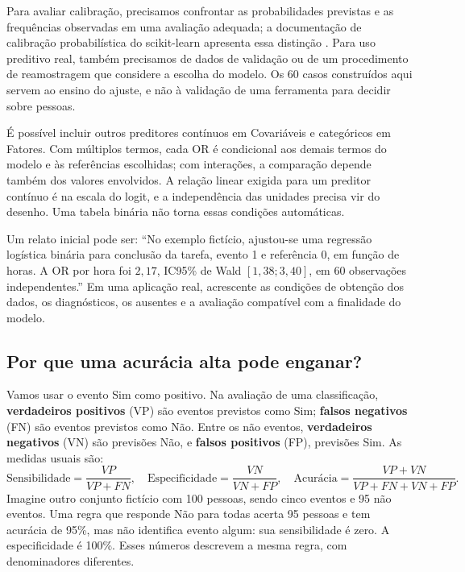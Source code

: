 Para avaliar calibração, precisamos confrontar as probabilidades previstas e as frequências observadas em uma avaliação adequada; a documentação de calibração probabilística do scikit-learn apresenta essa distinção \parencite{SKLearnCalibracao}. Para uso preditivo real, também precisamos de dados de validação ou de um procedimento de reamostragem que considere a escolha do modelo. Os 60 casos construídos aqui servem ao ensino do ajuste, e não à validação de uma ferramenta para decidir sobre pessoas.

É possível incluir outros preditores contínuos em Covariáveis e categóricos em Fatores. Com múltiplos termos, cada OR é condicional aos demais termos do modelo e às referências escolhidas; com interações, a comparação depende também dos valores envolvidos. A relação linear exigida para um preditor contínuo é na escala do logit, e a independência das unidades precisa vir do desenho. Uma tabela binária não torna essas condições automáticas.

Um relato inicial pode ser: ``No exemplo fictício, ajustou-se uma regressão logística binária para conclusão da tarefa, evento 1 e referência 0, em função de horas. A OR por hora foi $2{,}17$, IC95\% de Wald $[1{,}38;3{,}40]$, em 60 observações independentes.'' Em uma aplicação real, acrescente as condições de obtenção dos dados, os diagnósticos, os ausentes e a avaliação compatível com a finalidade do modelo.

\subsection{Por que uma acurácia alta pode enganar?}

Vamos usar o evento Sim como positivo. Na avaliação de uma classificação, \textbf{verdadeiros positivos} (VP) são eventos previstos como Sim; \textbf{falsos negativos} (FN) são eventos previstos como Não. Entre os não eventos, \textbf{verdadeiros negativos} (VN) são previsões Não, e \textbf{falsos positivos} (FP), previsões Sim. As medidas usuais são:
\[
\text{Sensibilidade}=\frac{VP}{VP+FN},\quad
\text{Especificidade}=\frac{VN}{VN+FP},\quad
\text{Acurácia}=\frac{VP+VN}{VP+FN+VN+FP}.
\]
Imagine outro conjunto fictício com 100 pessoas, sendo cinco eventos e 95 não eventos. Uma regra que responde Não para todas acerta 95 pessoas e tem acurácia de 95\%, mas não identifica evento algum: sua sensibilidade é zero. A especificidade é 100\%. Esses números descrevem a mesma regra, com denominadores diferentes.

